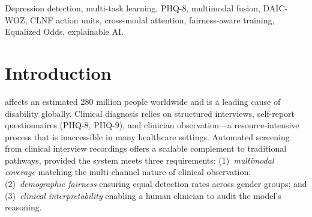 \documentclass[journal]{IEEEtran}
\begin{document}
\begin{abstract}
On the held-out test split ($N{=}47$), the model achieves
F1~$=0.585$, AUC~$=0.706$, numerically above the dev AUC though well
within the $\approx$0.08--0.09 standard error expected for AUC at
this $N$, so this should be read as evidence the model did not
overfit the dev set rather than as evidence of superior test
performance; pooled 10-fold cross-validation over all 188
participants shows the test split's nominal gender-TPR parity is not
stable across folds (mean TPR gap~$0.415\pm0.211$). Three convergent
explainability methods identify audio as the most informative
modality on dev, and gradient saliency places the clinically-known
marker AU04 within its top-5 attributed facial features, though not
top-ranked. An external diagnostic-specificity probe finds the model
separates depression from normal controls (AUC~$0.678$) but only
weakly from suicidality ($0.573$) or anxiety ($0.568$), partially
supporting the concern that DAIC-WOZ classifiers capture
disorder-general rather than depression-specific signal. We distill
these audits into a six-item, reusable validity checklist for other
DAIC-WOZ studies. Our contribution is methodological rigor and
transparent reporting---including honest negative results and
explicit statistical-power analysis---rather than
state-of-the-art performance.
\end{abstract}

\begin{IEEEkeywords}
Depression detection, multi-task learning, PHQ-8, multimodal fusion,
DAIC-WOZ, CLNF action units, cross-modal attention, fairness-aware
training, Equalized Odds, explainable AI.
\end{IEEEkeywords}

\section{Introduction}
\label{sec:intro}

 affects an estimated 280 million people
worldwide \cite{who2023} and is a leading cause of disability globally.
Clinical diagnosis relies on structured interviews, self-report
questionnaires (PHQ-8, PHQ-9), and clinician observation---a
resource-intensive process that is inaccessible in many healthcare
settings. Automated screening from clinical interview recordings offers
a scalable complement to traditional pathways, provided the system
meets three requirements: (1)~\emph{multimodal coverage} matching the
multi-channel nature of clinical observation; (2)~\emph{demographic
fairness} ensuring equal detection rates across gender groups; and
(3)~\emph{clinical interpretability} enabling a human clinician to
audit the model's reasoning.
\end{document}
